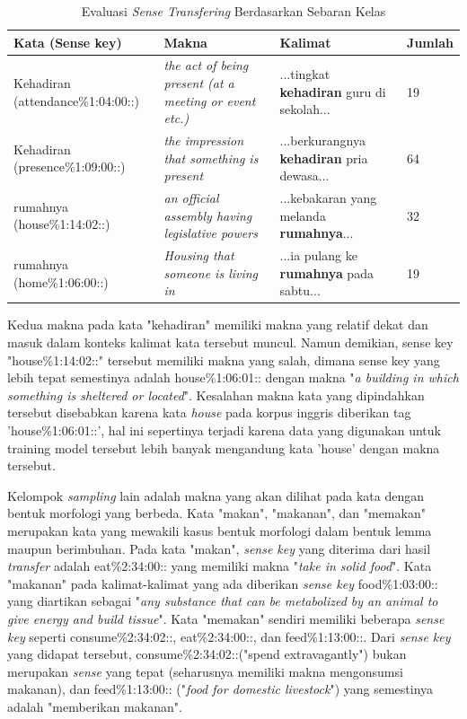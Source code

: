 \begin{table}
	\centering
	\caption{Evaluasi \textit{Sense Transfering} Berdasarkan Sebaran Kelas}
	\label{table:class-instance-sense-transfering-evaluation}
	\begin{tabular}{|p{4cm}|p{2.85cm}|p{2.85cm}|p{1.2cm}|}
		\hline
		Kata (Sense key) & Makna & Kalimat & Jumlah
		\\ \hline
		Kehadiran (attendance\%1:04:00::)  & 
		\textit{the act of being present (at a meeting or event etc.)}   & 
		...tingkat \textbf{kehadiran} guru di sekolah... &
		19
		\\ \hline
		Kehadiran (presence\%1:09:00::) & 
		\textit{the impression that something is present}   & 
		...berkurangnya \textbf{kehadiran} pria dewasa...
		&
		64
		\\ \hline
		rumahnya (house\%1:14:02::) & 
		\textit{an official assembly having legislative powers} & 
		...kebakaran yang melanda \textbf{rumahnya}...
		& 32
		\\ \hline
		rumahnya (home\%1:06:00::) &
		\textit{Housing that someone is living in} &
		...ia pulang ke \textbf{rumahnya} pada sabtu...
		& 19
		\\ \hline
	\end{tabular}
\end{table}

Kedua makna pada kata "kehadiran" memiliki makna yang relatif dekat dan masuk dalam konteks kalimat kata tersebut muncul. Namun demikian, sense key "house\%1:14:02::" tersebut memiliki makna yang salah, dimana sense key yang lebih tepat semestinya adalah house\%1:06:01:: dengan makna "\textit{a building in which something is sheltered or located}". Kesalahan makna kata yang dipindahkan tersebut disebabkan karena kata \textit{house} pada korpus inggris diberikan tag 'house\%1:06:01::', hal ini sepertinya terjadi karena data yang digunakan untuk training model tersebut lebih banyak mengandung kata 'house' dengan makna tersebut.

Kelompok \textit{sampling} lain adalah makna yang akan dilihat pada kata dengan bentuk morfologi yang berbeda. Kata "makan", "makanan", dan "memakan" merupakan kata yang mewakili kasus bentuk morfologi dalam bentuk lemma maupun berimbuhan. Pada kata "makan", \textit{sense key} yang diterima dari hasil \textit{transfer} adalah eat\%2:34:00:: yang memiliki makna "\textit{take in solid food}". Kata "makanan" pada kalimat-kalimat yang ada diberikan \textit{sense key} food\%1:03:00:: yang diartikan sebagai "\textit{any substance that can be metabolized by an animal to give energy and build tissue}". Kata "memakan" sendiri memiliki beberapa \textit{sense key} seperti consume\%2:34:02::, eat\%2:34:00::, dan feed\%1:13:00::. Dari \textit{sense key} yang didapat tersebut, consume\%2:34:02::("spend extravagantly") bukan merupakan \textit{sense} yang tepat (seharusnya memiliki makna mengonsumsi makanan), dan feed\%1:13:00:: ("\textit{food for domestic livestock}") yang semestinya adalah "memberikan makanan".

